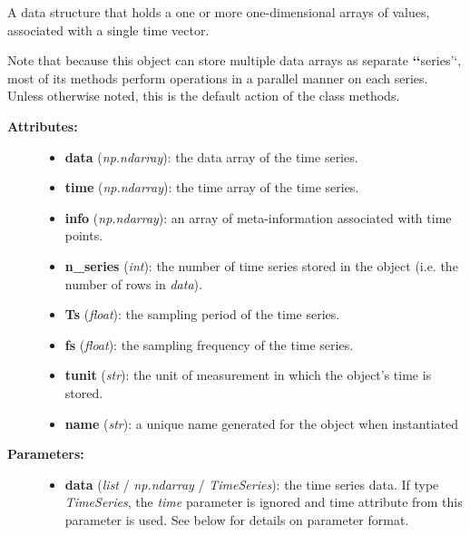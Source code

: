 \documentclass[letterpaper,10pt,english]{sphinxmanual}
\begin{document}
\begin{fulllineitems}
\label{data_structures:time_series.TimeSeries}
A data structure that holds a one or more one-dimensional arrays of values, associated with a single time vector.

Note that because this object can store multiple data arrays as separate {\color{red}\bfseries{}{}`{}`}series'`, most of its methods perform operations in a parallel manner on each series. Unless otherwise noted, this is the default action of the class methods.
\begin{description}
\item[{\textbf{Attributes:}}] \leavevmode\begin{itemize}
\item {} 
\textbf{data} (\emph{np.ndarray}): the data array of the time series.

\item {} 
\textbf{time} (\emph{np.ndarray}): the time array of the time series.

\item {} 
\textbf{info} (\emph{np.ndarray}): an array of meta-information associated with time points.

\item {} 
\textbf{n\_series} (\emph{int}): the number of time series stored in the object (i.e. the number of rows in \emph{data}).

\item {} 
\textbf{Ts} (\emph{float}): the sampling period of the time series.

\item {} 
\textbf{fs} (\emph{float}): the sampling frequency of the time series.

\item {} 
\textbf{tunit} (\emph{str}): the unit of measurement in which the object's time is stored.

\item {} 
\textbf{name} (\emph{str}): a unique name generated for the object when instantiated

\end{itemize}

\item[{\textbf{Parameters:}}] \leavevmode\begin{itemize}
\item {} 
\textbf{data} (\emph{list} / \emph{np.ndarray} / \emph{TimeSeries}): the time series data. If type \emph{TimeSeries}, the \emph{time} parameter is ignored and time attribute from this parameter is used. See below for details on parameter format.


\end{itemize}
\end{description}
\end{fulllineitems}
\end{document}
